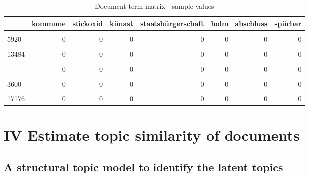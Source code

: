 \documentclass[
]{article}
\begin{document}
\begin{table}[H]

\caption{\label{tab:Document term matrix}Document-term matrix - sample values \label{table:dtm}}
\centering
\fontsize{7}{9}\selectfont
\begin{tabular}[t]{lrrrrrrr}
\toprule
  & kommune & stickoxid & künast & staatsbürgerschaft & holm & abschluss & spürbar\\
\midrule
\cellcolor{gray!6}{10562} & \cellcolor{gray!6}{0} & \cellcolor{gray!6}{0} & \cellcolor{gray!6}{0} & \cellcolor{gray!6}{0} & \cellcolor{gray!6}{0} & \cellcolor{gray!6}{0} & \cellcolor{gray!6}{0}\\
5920 & 0 & 0 & 0 & 0 & 0 & 0 & 0\\
\cellcolor{gray!6}{1957} & \cellcolor{gray!6}{0} & \cellcolor{gray!6}{0} & \cellcolor{gray!6}{0} & \cellcolor{gray!6}{2} & \cellcolor{gray!6}{0} & \cellcolor{gray!6}{0} & \cellcolor{gray!6}{0}\\
13484 & 0 & 0 & 0 & 0 & 0 & 0 & 0\\
\cellcolor{gray!6}{15418} & \cellcolor{gray!6}{0} & \cellcolor{gray!6}{0} & \cellcolor{gray!6}{0} & \cellcolor{gray!6}{0} & \cellcolor{gray!6}{0} & \cellcolor{gray!6}{0} & \cellcolor{gray!6}{0}\\
\addlinespace
15988 & 0 & 0 & 0 & 0 & 0 & 0 & 0\\
\cellcolor{gray!6}{15913} & \cellcolor{gray!6}{0} & \cellcolor{gray!6}{0} & \cellcolor{gray!6}{0} & \cellcolor{gray!6}{0} & \cellcolor{gray!6}{0} & \cellcolor{gray!6}{0} & \cellcolor{gray!6}{0}\\
3600 & 0 & 0 & 0 & 0 & 0 & 0 & 0\\
\cellcolor{gray!6}{6201} & \cellcolor{gray!6}{0} & \cellcolor{gray!6}{0} & \cellcolor{gray!6}{2} & \cellcolor{gray!6}{0} & \cellcolor{gray!6}{0} & \cellcolor{gray!6}{0} & \cellcolor{gray!6}{0}\\
17176 & 0 & 0 & 0 & 0 & 0 & 0 & 0\\
\bottomrule
\end{tabular}
\end{table}

\hypertarget{iv-estimate-topic-similarity-of-documents}{%
\section{IV Estimate topic similarity of
documents}\label{iv-estimate-topic-similarity-of-documents}}

\hypertarget{a-structural-topic-model-to-identify-the-latent-topics}{%
\subsection{A structural topic model to identify the latent
topics}\label{a-structural-topic-model-to-identify-the-latent-topics}}
\end{document}
